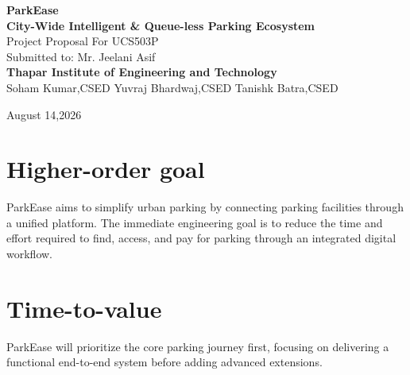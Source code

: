 \documentclass[12pt,a4paper]{article}
\begin{document}

\begin{center}

    {\LARGE \textbf{ParkEase}}\\[0.3cm]

    {\Large \textbf{City-Wide Intelligent \& Queue-less Parking Ecosystem}}\\[0.7cm]

    Project Proposal For UCS503P\\
    Submitted to: Mr. Jeelani Asif\\
    \textbf{Thapar Institute of Engineering and Technology}\\
    Soham Kumar,CSED\hspace{0.5cm}
    Yuvraj Bhardwaj,CSED\hspace{0.5cm}
    Tanishk Batra,CSED\\

    \vspace{0.5cm}

    August 14,2026

\end{center}


\section{Higher-order goal}

ParkEase aims to simplify urban parking by connecting parking facilities through a unified platform. The immediate engineering goal is to reduce the time and effort required to find, access, and pay for parking through an integrated digital workflow.


\section{Time-to-value}

ParkEase will prioritize the core parking journey first, focusing on delivering a functional end-to-end system before adding advanced extensions.
\end{document}
